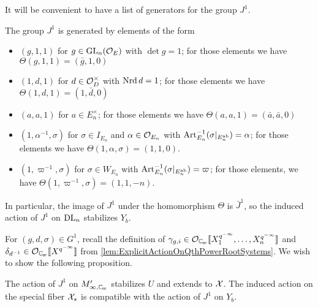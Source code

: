 \documentclass[../main.tex]{subfiles}
\begin{document}
It will be convenient to have a list of generators for the group $J^1$. 
\begin{lem}\label{lem:GeneratorsForJ1}
  The group $J^1$ is generated by elements of the form
  \begin{itemize}
    \item $(g,1,1)$ for $g \in \operatorname{GL}_n(\mathcal{O}_E)$ with $\det g = 1$; for those
      elements we have $\Theta(g,1,1) = (\bar g, 1,0)$
    \item $(1,d,1)$ for $d \in \mathcal{O}_D^\times$ with $\operatorname{Nrd} d = 1$; for those
      elements we have $\Theta(1,d,1) = (1 , \bar d,0)$
    \item $(a,a,1)$ for $a \in E_n^\times$; for those
      elements we have $\Theta(a,a,1) = (\bar a, \bar a,0)$
    \item $(1, \alpha^{-1}, \sigma)$ for $\sigma \in I_{E_n}$ 
      and $\alpha \in \mathcal{O}_{E_n}$ with $\operatorname{Art}_{E_n}^{-1}(\sigma|_{E_n^{\mathrm{ab}}}) = \alpha$;
      for those elements we have $\Theta(1,\alpha,\sigma) = (1, 1,0)$.
    \item $(1, \varpi^{-1}, \sigma)$ for $\sigma \in W_{E_n}$ with
      $\operatorname{Art}^{-1}_{E_n}(\sigma|_{E_n^{\mathrm{ab}}}) = \varpi$; for those
elements, we have $\Theta(1,\varpi^{-1},\sigma) = (1, 1, -n)$. 
  \end{itemize}
  \end{lem}
In particular, the image of $J^1$ under the homomorphism $\Theta$ is 
$\bar J^1$, so the induced action of $J^1$ on $\mathrm{DL}_n$ stabilizes $Y_b$.

For $(g,d,\sigma) \in G^1$, recall the definition of $\gamma_{g,i} \in \cO_\Cp\llbr
X_1^{q^{-\infty}}, \dots, X_n^{q^{-\infty}}\rrbr$ and 
$\delta_{d^{-1}} \in \cO_\Cp \llbr X^{q^{-\infty}} \rrbr$ from 
\cref{lem:ExplicitActionOnQthPowerRootSystems}. 
We wish to show the following proposition.

\begin{prop}\label{prop:J1ActionOnAffinoid}
  The action of $J^1$ on $M_{\infty, \Cp}'$ stabilizes $U$ and extends to
  $\mathcal{X}$. The induced action on the special fiber $\mathcal{X}_s$ is compatible with the
  action of $J^1$ on $Y_b$.
\end{prop}
\end{document}

